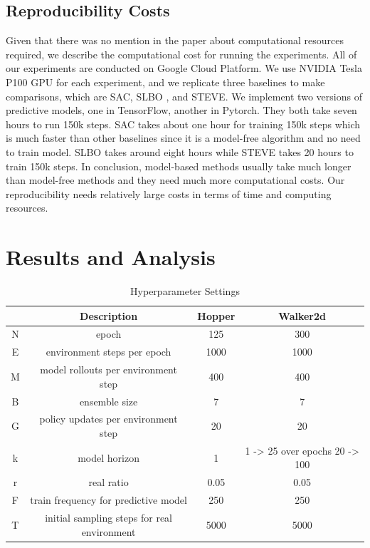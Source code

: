 \documentclass{article}
\begin{document}
\subsection{Reproducibility Costs}
Given that there was no mention in the paper about computational resources required, we describe the computational cost for running the experiments. All of our experiments are conducted on Google Cloud Platform. We use NVIDIA Tesla P100 GPU for each experiment, and we replicate three baselines to make comparisons, which are SAC, SLBO \cite{ref10}, and STEVE. We implement two versions of predictive models, one in TensorFlow, another in Pytorch. They both take seven hours to run 150k steps. SAC takes about one hour for training 150k steps which is much faster than other baselines since it is a model-free algorithm and no need to train model. SLBO takes around eight hours while STEVE takes 20 hours to train 150k steps. In conclusion, model-based methods usually take much longer than model-free methods and they need much more computational costs. Our reproducibility needs relatively large costs in terms of time and computing resources.

\section{Results and Analysis}
\begin{table}[h]
  \caption{Hyperparameter Settings}
  \centering
  \begin{tabular}{cccc}
    \toprule
    \cmidrule(r){0-3}
        & Description     & Hopper         & Walker2d   \\
    \midrule
    N   & epoch           & 125               & 300           \\
    E   & environment steps per epoch & 1000               & 1000           \\
    M   & model rollouts per environment step       & 400      &    400           \\
    B   & ensemble size           & 7               & 7           \\
    G   & policy updates per environment step           & 20               & 20           \\ 
    k   & model horizon           &  1              & 1 -> 25 over epochs 20 -> 100           \\
    r   & real ratio           &  0.05             & 0.05           \\
    F   & train frequency for predictive model           &  250             & 250           \\
    T   & initial sampling steps for real environment          &  5000             & 5000           \\
    \bottomrule
  \end{tabular}
\end{table}
\end{document}
